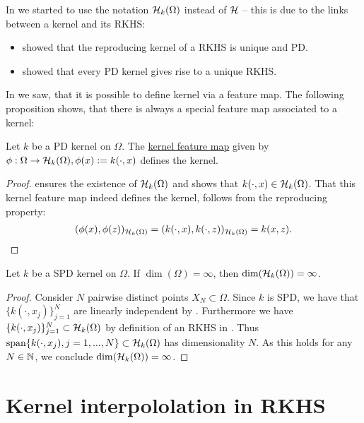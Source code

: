In  we started to use the notation $\mathcal H_k (\Omega)$ instead of $\mathcal{H}$ -- this is due to the links between a kernel and its RKHS:
\begin{itemize}
\item {} showed that the reproducing kernel of a RKHS is unique and PD.
\item {} showed that every PD kernel gives rise to a unique RKHS.
\end{itemize}

In  we saw, that it is possible to define kernel via a feature map. 
The following proposition shows,
that there is always a special feature map associated to a kernel:

\begin{prop}
Let $k$ be a PD kernel on $\Omega$. 
The \underline{kernel feature map} given by $\phi: \Omega \rightarrow \mathcal H_k (\Omega), \phi(x) := k(\cdot, x)$ defines the kernel. 
\end{prop}

\begin{proof}
 ensures the existence of $\mathcal H_k (\Omega)$ and shows that $k(\cdot, x) \in \mathcal H_k (\Omega)$. 
That this kernel feature map indeed defines the kernel, follows from the reproducing property:
\begin{align*}
(\phi(x), \phi(z))_{\mathcal H_k (\Omega)} = (k(\cdot, x), k(\cdot, z))_{\mathcal H_k (\Omega)} = k(x, z).
\end{align*}
\end{proof}



\begin{prop}
Let $k$ be a SPD kernel on $\Omega$.
If $\dim(\Omega) = \infty$, then $\dim(\mathcal H_k (\Omega)) = \infty$.
\end{prop}


\begin{proof}
Consider $N$ pairwise distinct points $X_N \subset \Omega$.
Since $k$ is SPD, we have that $\{k(\cdot, x_j) \}_{j=1}^N$ are linearly independent by . 
Furthermore we have $\{k(\cdot, x_j) \}_{j=1}^N \subset \mathcal H_k (\Omega)$ by definition of an RKHS in .
Thus $\mathrm{span} \{ k(\cdot, x_j), j=1, ..., N \} \subset \mathcal H_k (\Omega)$ has dimensionality $N$.
As this holds for any $N \in \mathbb{N}$, we conclude $\dim(\mathcal H_k (\Omega)) = \infty$.
\end{proof}



\section{Kernel interpololation in RKHS}

